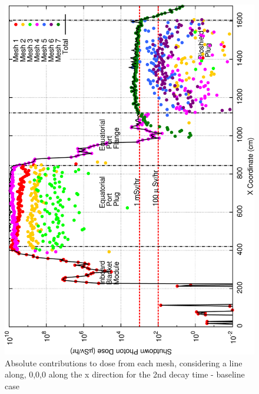 \documentclass[12pt]{article}
\begin{document}
\begin{figure}[ht!]
\centering
\includegraphics[clip,scale=0.25]{../plots/crosstalk/nob4c/ep/dc2.png}
\caption{Absolute contributions to dose from each mesh, considering a line along, 
         0,0,0 along the x direction for the 2nd decay time - baseline case}
\label{fig:ct_ep_dc2}
\end{figure}
\end{document}

